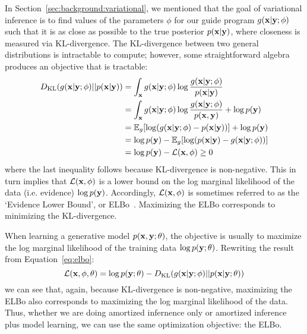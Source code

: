 In Section~\ref{sec:background:variational}, we mentioned that the goal of variational inference is to find values of the parameters $\phi$ for our guide program $g(\mathbf{x} | \mathbf{y} ; \phi)$ such that it is as close as possible to the true posterior $p(\mathbf{x} | \mathbf{y})$, where closeness is measured via KL-divergence. The KL-divergence between two general distributions is intractable to compute; however, some straightforward algebra produces an objective that is tractable:
\begin{align}
\begin{split}
D_{\text{KL}}(g(\mathbf{x} | \mathbf{y} ; \phi) || p(\mathbf{x} | \mathbf{y}))
&= \int_{\mathbf{x}} g(\mathbf{x} | \mathbf{y} ; \phi) \log \frac{g(\mathbf{x} | \mathbf{y} ; \phi)}{p(\mathbf{x} | \mathbf{y})}\\
&= \int_{\mathbf{x}} g(\mathbf{x} | \mathbf{y} ; \phi) \log \frac{g(\mathbf{x} | \mathbf{y} ; \phi)}{p(\mathbf{x}, \mathbf{y})} + \log p(\mathbf{y})\\
&= \mathbb{E}_{g}[ \log(g(\mathbf{x} | \mathbf{y} ; \phi) -  p(\mathbf{x} | \mathbf{y}) ) ] + \log p(\mathbf{y})\\
&= \log p(\mathbf{y}) - \mathbb{E}_{g}[ \log( p(\mathbf{x} | \mathbf{y}) - g(\mathbf{x} | \mathbf{y} ; \phi) ) ]\\
&= \log p(\mathbf{y}) - \mathcal{L}(\mathbf{x}, \phi) \geq 0
\end{split}
\label{eq:elbo}
\end{align}
where the last inequality follows because KL-divergence is non-negative. This in turn implies that $\mathcal{L}(\mathbf{x}, \phi)$ is a lower bound on the log marginal likelihood of the data (i.e. evidence) $\log p(\mathbf{y})$. Accordingly, $\mathcal{L}(\mathbf{x}, \phi)$ is sometimes referred to as the `Evidence Lower Bound', or ELBo~\cite{BBVI}. Maximizing the ELBo corresponds to minimizing the KL-divergence.

When learning a generative model $p(\mathbf{x}, \mathbf{y}; \theta)$, the objective is usually to maximize the log marginal likelihood of the training data $\log p(\mathbf{y}; \theta)$. Rewriting the result from Equation~\ref{eq:elbo}:
\begin{equation*}
\mathcal{L}(\mathbf{x}, \phi, \theta) = \log p(\mathbf{y} ; \theta) - D_{\text{KL}}(g(\mathbf{x} | \mathbf{y} ; \phi) || p(\mathbf{x} | \mathbf{y} ; \theta))
\end{equation*}
we can see that, again, because KL-divergence is non-negative, maximizing the ELBo also corresponds to maximizing the log marginal likelihood of the data. Thus, whether we are doing amortized infernence only or amortized inference plus model learning, we can use the same optimization objective: the ELBo.

